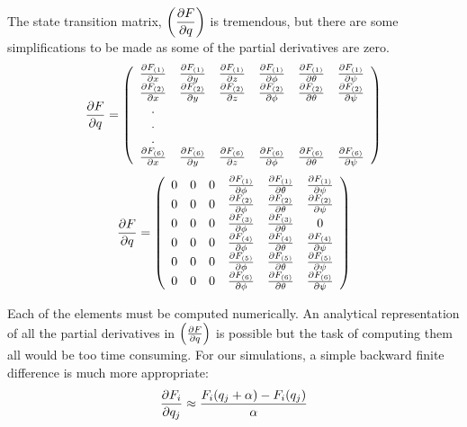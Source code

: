 The state transition matrix, $\displaystyle \left(\frac{\partial F}{\partial q}\right)$  is tremendous, but there are some simplifications to be made as some of the partial derivatives are zero.
\begin{equation}
    \frac{\partial F}{\partial q} = \left(
    \begin{array}{c c c c c c}
    \frac{\partial F_{(1)}}{\partial x} & \frac{\partial F_{(1)}}{\partial y} & \frac{\partial F_{(1)}}{\partial z} & \frac{\partial F_{(1)}}{\partial \phi} & \frac{\partial F_{(1)}}{\partial \theta} & \frac{\partial F_{(1)}}{\partial \psi}\\
    \frac{\partial F_{(2)}}{\partial x} & \frac{\partial F_{(2)}}{\partial y} & \frac{\partial F_{(2)}}{\partial z} & \frac{\partial F_{(2)}}{\partial \phi} & \frac{\partial F_{(2)}}{\partial \theta} & \frac{\partial F_{(2)}}{\partial \psi}\\
    .\\
    .\\
    .\\
    \frac{\partial F_{(6)}}{\partial x} & \frac{\partial F_{(6)}}{\partial y} & \frac{\partial F_{(6)}}{\partial z} & \frac{\partial F_{(6)}}{\partial \phi} & \frac{\partial F_{(6)}}{\partial \theta} & \frac{\partial F_{(6)}}{\partial \psi}\\
    \end{array}\right)
\end{equation}
\begin{equation}
    \frac{\partial F}{\partial q} = \left(
    \begin{array}{c c c c c c}
    0 & 0 & 0 & \frac{\partial F_{(1)}}{\partial \phi} & \frac{\partial F_{(1)}}{\partial \theta} & \frac{\partial F_{(1)}}{\partial \psi}\\
    0 & 0 & 0 & \frac{\partial F_{(2)}}{\partial \phi} & \frac{\partial F_{(2)}}{\partial \theta} & \frac{\partial F_{(2)}}{\partial \psi}\\
    0 & 0 & 0 & \frac{\partial F_{(3)}}{\partial \phi} & \frac{\partial F_{(3)}}{\partial \theta} & 0\\
    0 & 0 & 0 & \frac{\partial F_{(4)}}{\partial \phi} & \frac{\partial F_{(4)}}{\partial \theta} & \frac{\partial F_{(4)}}{\partial \psi}\\
    0 & 0 & 0 & \frac{\partial F_{(5)}}{\partial \phi} & \frac{\partial F_{(5)}}{\partial \theta} & \frac{\partial F_{(5)}}{\partial \psi}\\
    0 & 0 & 0 & \frac{\partial F_{(6)}}{\partial \phi} & \frac{\partial F_{(6)}}{\partial \theta} & \frac{\partial F_{(6)}}{\partial \psi}\\
    \end{array}\right)
\end{equation}

Each of the elements must be computed numerically. An analytical representation of all the partial derivatives in $\left(\frac{\partial F}{\partial q}\right)$ is possible but the task of computing them all would be too time consuming. For our simulations, a simple backward finite difference is much more appropriate:
\begin{equation}
    \frac{\partial F_i}{\partial q_j} \approx \frac{ F_i(q_j + \alpha) - F_i(q_j)  }{\alpha}
\end{equation}

